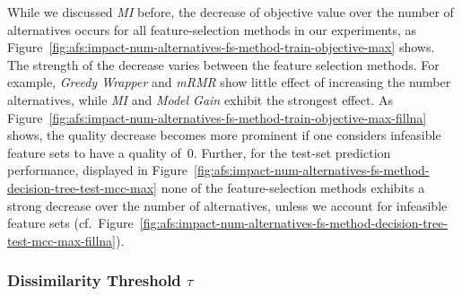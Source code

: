 \documentclass{article}
\theoremstyle{definition}
\begin{document}
While we discussed \emph{MI} before, the decrease of objective value over the number of alternatives occurs for all feature-selection methods in our experiments, as Figure~\ref{fig:afs:impact-num-alternatives-fs-method-train-objective-max} shows.
The strength of the decrease varies between the feature selection methods.
For example, \emph{Greedy Wrapper} and \emph{mRMR} show little effect of increasing the number alternatives, while \emph{MI} and \emph{Model Gain} exhibit the strongest effect.
As Figure~\ref{fig:afs:impact-num-alternatives-fs-method-train-objective-max-fillna} shows, the quality decrease becomes more prominent if one considers infeasible feature sets to have a quality of~0.
Further, for the test-set prediction performance, displayed in Figure~\ref{fig:afs:impact-num-alternatives-fs-method-decision-tree-test-mcc-max} none of the feature-selection methods exhibits a strong decrease over the number of alternatives, unless we account for infeasible feature sets (cf.~Figure~\ref{fig:afs:impact-num-alternatives-fs-method-decision-tree-test-mcc-max-fillna}).

\subsubsection{Dissimilarity Threshold \texorpdfstring{$\tau$}{}} %
\label{sec:afs:evaluation:search:tau}
\end{document}
